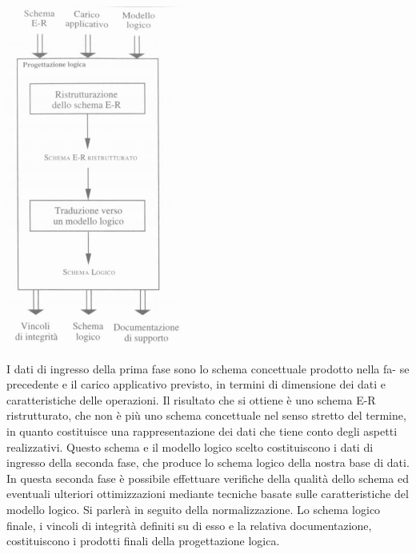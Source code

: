 \documentclass[a4paper,12pt, oneside]{book}
\begin{document}
\begin{center}
\includegraphics[scale=0.9]{img/log.png}
\end{center}
I dati di ingresso della prima fase sono lo schema concettuale prodotto nella fa-
se precedente e il carico applicativo previsto, in termini di dimensione dei dati
e caratteristiche delle operazioni. Il risultato che si ottiene è uno schema E-R ristrutturato, che non è più uno schema concettuale nel senso stretto del termine,
in quanto costituisce una rappresentazione dei dati che tiene conto degli aspetti
realizzativi. Questo schema e il modello logico scelto costituiscono i dati di ingresso
della seconda fase, che produce lo schema logico della nostra base di dati.
In questa seconda fase è possibile effettuare verifiche della qualità dello schema ed
eventuali ulteriori ottimizzazioni mediante tecniche basate sulle caratteristiche del
modello logico. Si parlerà in seguito della normalizzazione. Lo schema logico finale,
i vincoli di integrità definiti su di esso e la relativa documentazione, costituiscono
i prodotti finali della progettazione logica.
\end{document}
